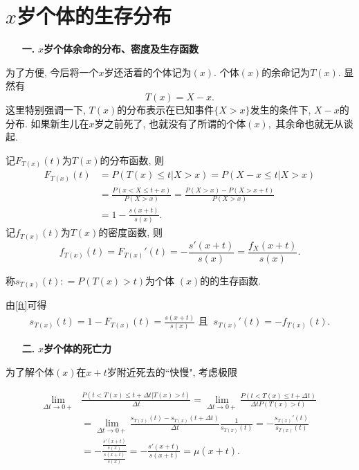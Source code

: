 \documentclass[a4paper,10pt]{ctexbook}
\newcommand{\hei}{\CJKfamily{hei}}      %
\def\no{\nonumber}
\begin{document}
\section{$x$岁个体的生存分布}

\begin{itemize}
    \item[{\bf\hei 一.}]{\bf\hei $x$岁个体余命的分布、密度及生存函数}
\end{itemize}

为了方便, 今后将一个$x$岁还活着的个体记为$(x).$ 个体$(x)$的余命记为$T(x).$ 显然有
$$T(x)=X-x.$$
这里特别强调一下,
$T(x)$的分布表示在已知事件$\{X>x\}$发生的条件下, $X-x$的分布. 如果新生儿在$x$岁之前死了, 也就没有了所谓的个体$(x),$ 其余命也就无从谈起.

记$F_{T(x)}(t)$为$T(x)$的分布函数, 则
\begin{align}\label{ft}
    F_{T(x)}(t) & = P(T(x) \leq t|X > x)
    = P(X- x \leq t | X > x)\no                        \\
                & = \frac{P(x<X \leq t + x)}{P(X > x)}
    = \frac{P(X > x) - P(X > x + t)}{P(X > x)}\no      \\
                & = 1 - \frac{s(x+t)}{s(x)}.
\end{align}
记$f_{T(x)}(t)$为$T(x)$的密度函数, 则
\begin{equation}\label{ftd}
    f_{T(x)}(t) = F_{T(x)}'(t) = -\frac{s'(x+t)}{s(x)} = \frac{f_X(x+t)}{s(x)}.
\end{equation}
\begin{definition}
    称$s_{T(x)}(t): = P(T(x)>t)$为个体 $(x)$的的生存函数.
\end{definition}

由\eqref{ft}可得
\begin{align}\label{stf}
    s_{T(x)}(t)=1-F_{T(x)}(t)=\frac{s(x+t)}{s(x)} \text{ 且 }\  s_{T(x)}'(t)=-f_{T(x)}(t).
\end{align}


\begin{itemize}
    \item[{\bf\hei 二.}]{\bf\hei $x$岁个体的死亡力}
\end{itemize}
为了解个体$(x)$在$x+t$岁附近死去的``快慢", 考虑极限

\begin{align*}
    \lim_{\Delta t\to0+} & \frac{P(t<T(x)\leqslant t+\Delta t|T(x)>t)}{\Delta t}
    =  \lim_{\Delta t\to0+}\frac{P(t<T(x)\leqslant t+\Delta t)}{\Delta tP(T(x)>t)}                                          \\
                         & = \lim_{\Delta t\to0+}\frac{s_{T(x)}(t) - s_{T(x)}(t + \Delta t)}{\Delta t}\frac{1}{s_{T(x)}(t)}
    = - \frac{s_{T(x)}'(t)}{s_{T(x)}(t)}                                                                                    \\
                         & = - \frac{\frac{s'(x+t)}{s(x)}}{\frac{s(x+t)}{s(x)}}
    =  -\frac{s'(x+t)}{s(x+t)} = \mu(x+t).
\end{align*}
\end{document}

